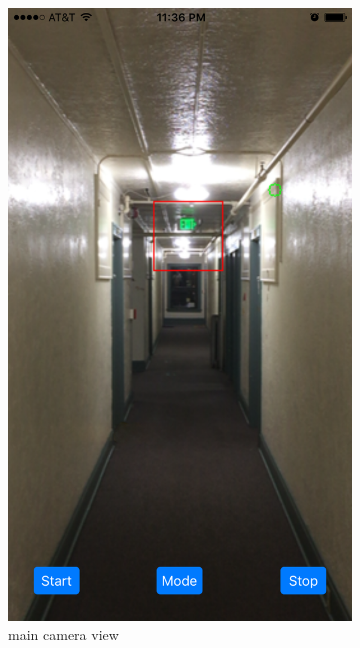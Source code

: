 \documentclass[11pt,letterpaper]{article}
\begin{document}
	\begin{figure}[h!]
		\centering
		\begin{subfigure}{.4\textwidth}
			\centering
			\includegraphics[width=1\linewidth]{hallway}
			\caption{main camera view}
		\end{subfigure}\space\space\space\space%
		\begin{subfigure}{.4\textwidth}
			\centering

\end{subfigure}
\end{figure}
\end{document}
